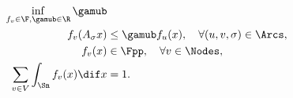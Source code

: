 \begin{myprog}[Primal]
  \label{prog:primalinf}
  \begin{align}
    \notag
    \inf_{f_v \in \F, \gamub \in \R} \gamub\\
    \label{eq:primalinf1}
    f_v(A_\sigma x) & \leq \gamub f_u(x), \quad \forall (u, v, \sigma) \in \Arcs,\\
    \notag
    f_v(x) & \in \Fpp, \quad \forall v \in \Nodes,\\
    \label{eq:primalinf3}
    \sum_{v \in V} \int_{\Sn} f_v(x) \dif x & = 1.
  \end{align}
\end{myprog}
